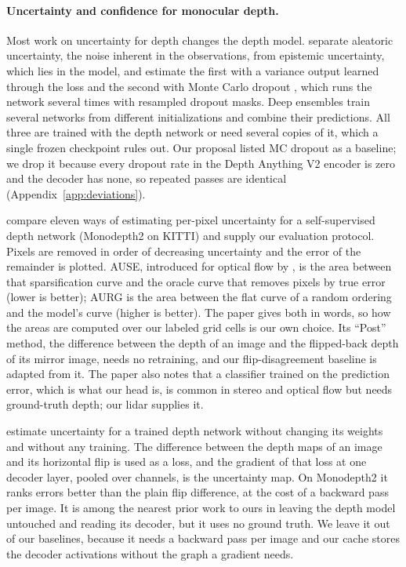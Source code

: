 \paragraph{Uncertainty and confidence for monocular depth.}
Most work on uncertainty for depth changes the depth model. \citet{kendall2017uncertainties} separate aleatoric uncertainty, the noise inherent in the observations, from epistemic uncertainty, which lies in the model, and estimate the first with a variance output learned through the loss and the second with Monte Carlo dropout \citep{gal2016dropout}, which runs the network several times with resampled dropout masks. Deep ensembles \citep{lakshminarayanan2017ensembles} train several networks from different initializations and combine their predictions. All three are trained with the depth network or need several copies of it, which a single frozen checkpoint rules out. Our proposal listed MC dropout as a baseline; we drop it because every dropout rate in the Depth Anything V2 encoder is zero and the decoder has none, so repeated passes are identical (Appendix~\ref{app:deviations}).

\citet{poggi2020uncertainty} compare eleven ways of estimating per-pixel uncertainty for a self-supervised depth network (Monodepth2 on KITTI) and supply our evaluation protocol. Pixels are removed in order of decreasing uncertainty and the error of the remainder is plotted. AUSE, introduced for optical flow by \citet{ilg2018uncertainty}, is the area between that sparsification curve and the oracle curve that removes pixels by true error (lower is better); AURG is the area between the flat curve of a random ordering and the model's curve (higher is better). The paper gives both in words, so how the areas are computed over our labeled grid cells is our own choice. Its ``Post'' method, the difference between the depth of an image and the flipped-back depth of its mirror image, needs no retraining, and our flip-disagreement baseline is adapted from it. The paper also notes that a classifier trained on the prediction error, which is what our head is, is common in stereo and optical flow but needs ground-truth depth; our lidar supplies it.

\citet{hornauer2022gradient} estimate uncertainty for a trained depth network without changing its weights and without any training. The difference between the depth maps of an image and its horizontal flip is used as a loss, and the gradient of that loss at one decoder layer, pooled over channels, is the uncertainty map. On Monodepth2 it ranks errors better than the plain flip difference, at the cost of a backward pass per image. It is among the nearest prior work to ours in leaving the depth model untouched and reading its decoder, but it uses no ground truth. We leave it out of our baselines, because it needs a backward pass per image and our cache stores the decoder activations without the graph a gradient needs.

